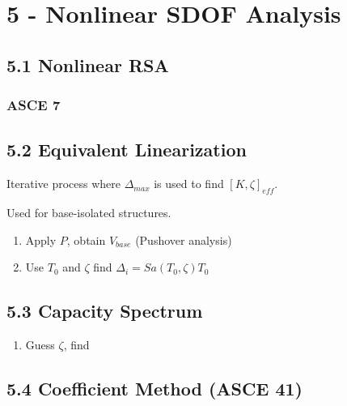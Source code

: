 \hypertarget{nonlinear-sdof-analysis}{%
\section{5 - Nonlinear SDOF Analysis}\label{nonlinear-sdof-analysis}}

\hypertarget{nonlinear-rsa}{%
\subsection{5.1 Nonlinear RSA}\label{nonlinear-rsa}}

\hypertarget{asce-7}{%
\subsubsection{ASCE 7}\label{asce-7}}

\hypertarget{equivalent-linearization}{%
\subsection{5.2 Equivalent
Linearization}\label{equivalent-linearization}}

Iterative process where \(\Delta_{max}\) is used to find
\([K,\zeta]_{eff}\).

Used for base-isolated structures.

\begin{enumerate}
\def\labelenumi{\arabic{enumi}.}
\tightlist
\item
  Apply \(P\), obtain \(V_{base}\) (Pushover analysis)
\item
  Use \(T_0\) and \(\zeta\) find \(\Delta_i = Sa(T_0,\zeta)T_0\)
\end{enumerate}

\hypertarget{capacity-spectrum}{%
\subsection{5.3 Capacity Spectrum}\label{capacity-spectrum}}

\begin{enumerate}
\def\labelenumi{\arabic{enumi}.}
\tightlist
\item
  Guess \(\zeta\), find
\end{enumerate}

\hypertarget{coefficient-method-asce-41}{%
\subsection{5.4 Coefficient Method (ASCE
41)}\label{coefficient-method-asce-41}}

